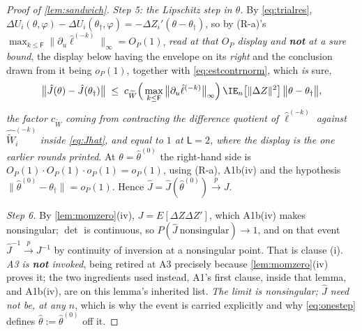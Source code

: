 \begin{proof}[Proof of \cref{lem:sandwich}]
\emph{Step 5: the Lipschitz step in $\theta$.} By \eqref{eq:trialres},
$\Delta U_i(\theta,\varphi)-\Delta U_i(\theta_\dagger,\varphi)=-\Delta Z_i'(\theta-\theta_\dagger)$, so by
(R-a)'s $\max_{k\le\mathsf F}\|\partial_u\hat\ell^{(-k)}\|_\infty=O_P(1)$, \emph{read at that
$O_P$ display and \textbf{not} at a sure bound}, the display below having the
envelope on its \emph{right} and the conclusion drawn from it being $o_P(1)$, together with
\eqref{eq:estcontrnorm}, which \emph{is} sure,
\[
\big\|\hat J(\theta)-\hat J(\theta_\dagger)\big\|
\;\le\;c_{\widetilde W}\Big(\max_{k\le\mathsf F}\big\|\partial_u\hat\ell^{(-k)}\big\|_\infty\Big)\,
\IE_n\big[\|\Delta Z\|^{2}\big]\,\big\|\theta-\theta_\dagger\big\| ,
\]
\emph{the factor $c_{\widetilde W}$ coming from contracting the difference quotient of
$\hat\ell^{(-k)}$ against $\widehat{\widetilde W}^{(-k)}_i$ inside \eqref{eq:Jhat}, and equal to $1$ at
$\mathsf L=2$, where the display is the one earlier rounds printed}.
At $\theta=\hat\theta^{(0)}$ the right-hand side is $O_P(1)\cdot O_P(1)\cdot o_P(1)=o_P(1)$, using (R-a),
A1b(iv) and the hypothesis $\|\hat\theta^{(0)}-\theta_\dagger\|=o_P(1)$. Hence
$\hat J=\hat J(\hat\theta^{(0)})\xrightarrow{p}J$.

\emph{Step 6.} By \cref{lem:momzero}\textup{(iv)}, $J=E[\Delta Z\Delta Z']$, which A1b(iv) makes
nonsingular; $\det$ is continuous, so $P(\hat J\ \text{nonsingular})\to1$, and on that event
$\hat J^{-1}\xrightarrow{p}J^{-1}$ by continuity of inversion at a nonsingular point. That is clause (i).
\emph{A3 is \textbf{not} invoked}, being retired at A3 precisely because
\cref{lem:momzero}\textup{(iv)} proves it; the two ingredients used instead, A1's first
clause, inside that lemma, and A1b(iv), are on this lemma's inherited list. \emph{The limit is
nonsingular; $\hat J$ need not be, at any $n$}, which is why the event is
carried explicitly and why \eqref{eq:onestep} defines $\hat\theta:=\hat\theta^{(0)}$ off it.


\end{proof}
